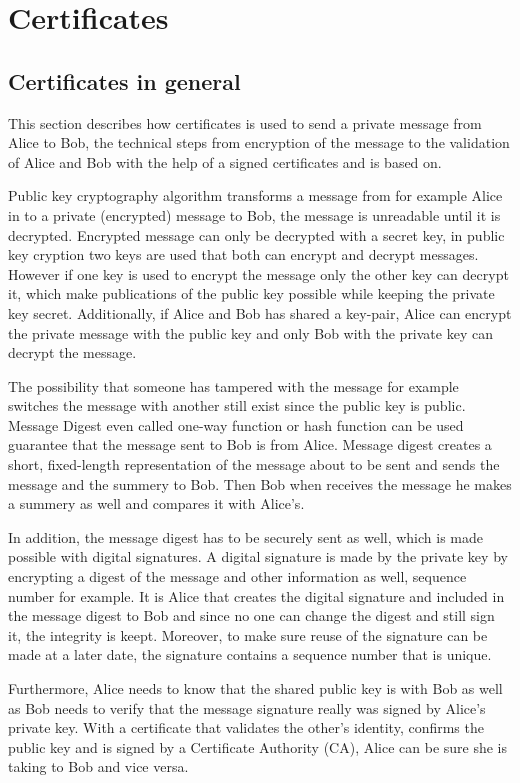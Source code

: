 \section{Certificates}
\subsection{Certificates in general}

This section describes how certificates is used to send a private message from Alice to Bob, the technical steps from encryption 
of the message to the validation of Alice and Bob with the help of a signed certificates and is based on\cite{website:ssl_intro}. 

Public key cryptography algorithm transforms a message from for example Alice in to a private (encrypted) message to Bob, 
the message is unreadable until it is decrypted. 
Encrypted message can only be decrypted with a secret key, in public key cryption two keys are used that both can encrypt and 
decrypt messages. 
However if one key is used to encrypt the message only the other key can decrypt it, which make publications of the public key 
possible while keeping the private key secret. 
Additionally, if Alice and Bob has shared a key-pair, Alice can encrypt the private message with the public key and only Bob 
with the private key can decrypt the message.

The possibility that someone has tampered with the message for example switches the message with another still exist since the public 
key is public. Message Digest even called one-way function or hash function can be used guarantee that the message sent to Bob is 
from Alice. Message digest creates a short, fixed-length representation of the message about to be sent and sends the message and
the summery to Bob. Then Bob when receives the message he makes a summery as well and compares it with Alice's.

In addition, the message digest has to be securely sent as well, which is made possible with digital signatures. A digital signature
is made by the private key by encrypting a digest of the message and other information as well, sequence number for example.
It is Alice that creates the digital signature and included in the message digest to Bob and since no one can change the digest and still 
sign it, the integrity is keept. Moreover, to make sure reuse of the signature can be made at a later date, the signature contains a 
sequence number that is unique. 

Furthermore, Alice needs to know that the shared public key is with Bob as well as Bob needs to verify that the message signature 
really was signed by Alice's private key. With a certificate that validates the other's identity, confirms the public key and
is signed by a Certificate Authority (CA), Alice can be sure she is taking to Bob and vice versa.

